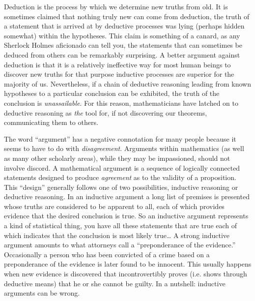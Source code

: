 \documentclass[10pt,]{book}
\theoremstyle{plain}
\theoremstyle{definition}
\theoremstyle{definition}
\numberwithin{equation}{section}
\begin{document}
    Deduction 
    is the process by which we determine new truths from old.
    It is sometimes claimed that nothing truly new can come from deduction,
    the truth of a statement that is arrived at by deductive processes was
    lying (perhaps hidden somewhat) within the hypotheses. This claim is something
    of a canard, as any Sherlock Holmes aficionado can tell you, the statements
    that can sometimes be deduced from others can be remarkably surprising.
    A better
    argument against deduction is that it is a relatively ineffective way for most
    human beings to discover new truths \textemdash{} for that purpose inductive processes are
    superior for the majority of us. Nevertheless, if a chain of deductive reasoning
    leading from known hypotheses to a particular conclusion can be exhibited, the truth
    of the conclusion is \emph{unassailable}. For this reason, mathematicians have
    latched on to deductive reasoning as \emph{the} tool for, if not discovering
    our theorems, communicating them to others.
\par

    The word ``argument'' has a negative connotation for many people because
    it seems to have to do with \emph{disagreement}. Arguments within mathematics
    (as well as many other scholarly areas), while they may be impassioned, should
    not involve discord. A mathematical argument is a sequence of logically
    connected statements designed to produce \emph{agreement} as to the validity
    of a proposition. This ``design'' generally follows one of two possibilities,
    inductive reasoning or deductive reasoning. In an inductive argument
    a long list of premises is presented whose truths are considered to be
    apparent to all, each of which provides evidence that the desired conclusion
    is true. So an inductive argument represents a kind of statistical thing,
    you have all these statements that are true each of which indicates that
    the conclusion is most likely true\dots{} A strong inductive argument
    amounts to what attorneys call a ``preponderance of the evidence.''
    Occasionally
    a person who has been convicted of a crime based on a preponderance of the
    evidence is later found to be innocent. This usually happens when new evidence
    is discovered that incontrovertibly proves (i.e. shows through deductive
    means) that he or she cannot be guilty. In a nutshell: inductive arguments
    can be wrong.
\par
\end{document}
